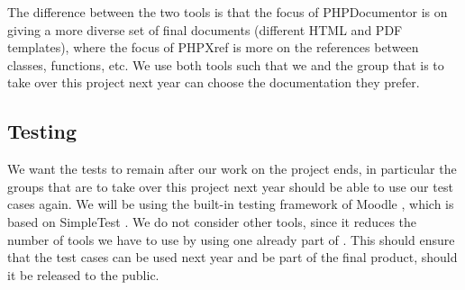 The difference between the two tools is that the focus of PHPDocumentor is on giving a more diverse set of final documents (different HTML and PDF templates), where the focus of PHPXref is more on the references between classes, functions, etc.
We use both tools such that we and the group that is to take over this project next year can choose the documentation they prefer.


\subsection{Testing}
\label{sub:testing}
We want the tests to remain after our work on the project ends, in particular the groups that are to take over this project next year should be able to use our test cases again.
We will be using the built-in testing framework of Moodle \cite{moodletest}, which is based on SimpleTest \cite{simpletest}.
We do not consider other tools, since it reduces the number of tools we have to use by using one already part of \moodle{}.
This should ensure that the test cases can be used next year and be part of the final product, should it be released to the public.